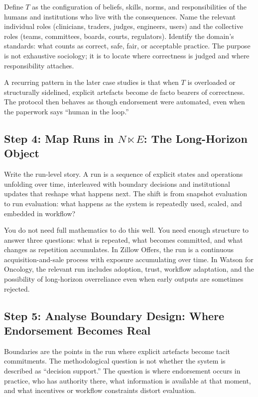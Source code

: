 Define \(T\) as the configuration of beliefs, skills, norms, and responsibilities of the humans and institutions who live with the consequences. Name the relevant individual roles (clinicians, traders, judges, engineers, users) and the collective roles (teams, committees, boards, courts, regulators). Identify the domain’s standards: what counts as correct, safe, fair, or acceptable practice. The purpose is not exhaustive sociology; it is to locate where correctness is judged and where responsibility attaches.

A recurring pattern in the later case studies is that when \(T\) is overloaded or structurally sidelined, explicit artefacts become de facto bearers of correctness. The protocol then behaves as though endorsement were automated, even when the paperwork says ``human in the loop.''

\subsection{Step 4: Map Runs in \(N \ltimes E\): The Long-Horizon Object}

Write the run-level story. A run is a sequence of explicit states and operations unfolding over time, interleaved with boundary decisions and institutional updates that reshape what happens next. The shift is from snapshot evaluation to run evaluation: what happens as the system is repeatedly used, scaled, and embedded in workflow?

You do not need full mathematics to do this well. You need enough structure to answer three questions: what is repeated, what becomes committed, and what changes as repetition accumulates. In Zillow Offers, the run is a continuous acquisition-and-sale process with exposure accumulating over time. In Watson for Oncology, the relevant run includes adoption, trust, workflow adaptation, and the possibility of long-horizon overreliance even when early outputs are sometimes rejected.

\subsection{Step 5: Analyse Boundary Design: Where Endorsement Becomes Real}

Boundaries are the points in the run where explicit artefacts become tacit commitments. The methodological question is not whether the system is described as ``decision support.'' The question is where endorsement occurs in practice, who has authority there, what information is available at that moment, and what incentives or workflow constraints distort evaluation.

